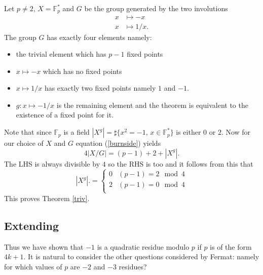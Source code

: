 \documentclass[12pt,a4paper]{amsart}
\def\fp{\mathbb{F}_p}
\begin{document}
Let $p\neq 2$,  $X = \fp^*$ and $G$ be the group generated by the two involutions
\begin{eqnarray*}
x & \mapsto -x \\
x & \mapsto 1/x.
\end{eqnarray*}
The group  $G$ has exactly four elements namely:
\begin{itemize}
\item the trivial element which has  $p-1$ fixed points
\item $x\mapsto -x$ which has no fixed points 
\item  $x\mapsto 1/x$ has exactly two fixed points namely $1$ and $-1$.
\item  $g:x \mapsto -1/x$ is the remaining element and the theorem is equivalent to the existence of a fixed point for it.
\end{itemize}
Note that since $\fp$ is a field 
$|X^g| = \sharp \{x^2 = -1, \, x\in \fp^* \}$
is either $0$ or $2$.
Now for our choice of $X$ and $G$ equation (\ref{burnside}) yields
\begin{equation}
4 |X/G|   = (p-1) + 2 + |X^g|.
\end{equation}  
The LHS is always divisible by $4$ so the  RHS is too and
it follows from this that
$$ |X^g|. = \left\{  \begin{array}{ll}
0 & (p-1) =  2 \mod 4 \\
2 & (p-1) =  0 \mod 4 \\
\end{array}
\right.
$$
This proves Theorem \ref{triv}.

\subsection{Extending}

Thus we have shown that $-1$ is a quadratic residue modulo $p$ if
$p$ is of the form $4k+1$. 
It is natural to consider the other questions considered by Fermat:
namely for which values of $p$ are $-2$ and $-3$ residues?
\end{document}
